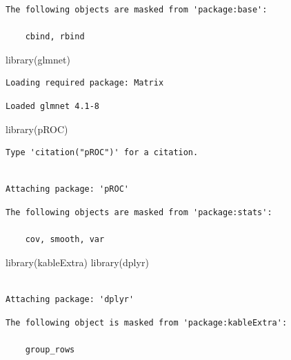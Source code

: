 \documentclass[
  letterpaper,
  DIV=11,
  numbers=noendperiod]{scrartcl}
\newenvironment{Shaded}{\begin{snugshade}}{\end{snugshade}}
\newcommand{\FunctionTok}[1]{\textcolor[rgb]{0.28,0.35,0.67}{#1}}
\newcommand{\NormalTok}[1]{\textcolor[rgb]{0.00,0.23,0.31}{#1}}
\begin{document}
\begin{verbatim}
The following objects are masked from 'package:base':

    cbind, rbind
\end{verbatim}

\begin{Shaded}
\begin{Highlighting}[]
\FunctionTok{library}\NormalTok{(glmnet)}
\end{Highlighting}
\end{Shaded}

\begin{verbatim}
Loading required package: Matrix
\end{verbatim}

\begin{verbatim}
Loaded glmnet 4.1-8
\end{verbatim}

\begin{Shaded}
\begin{Highlighting}[]
\FunctionTok{library}\NormalTok{(pROC)}
\end{Highlighting}
\end{Shaded}

\begin{verbatim}
Type 'citation("pROC")' for a citation.
\end{verbatim}

\begin{verbatim}

Attaching package: 'pROC'
\end{verbatim}

\begin{verbatim}
The following objects are masked from 'package:stats':

    cov, smooth, var
\end{verbatim}

\begin{Shaded}
\begin{Highlighting}[]
\FunctionTok{library}\NormalTok{(kableExtra)}
\FunctionTok{library}\NormalTok{(dplyr)}
\end{Highlighting}
\end{Shaded}

\begin{verbatim}

Attaching package: 'dplyr'
\end{verbatim}

\begin{verbatim}
The following object is masked from 'package:kableExtra':

    group_rows
\end{verbatim}
\end{document}
